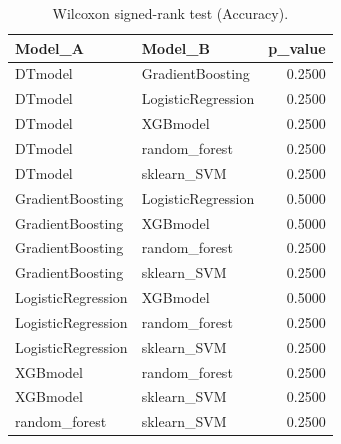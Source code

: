 \begin{table}[t]
\centering
\begin{tabular}{llr}
\toprule
Model_A & Model_B & p_value \\
\midrule
DTmodel & GradientBoosting & 0.2500 \\
DTmodel & LogisticRegression & 0.2500 \\
DTmodel & XGBmodel & 0.2500 \\
DTmodel & random_forest & 0.2500 \\
DTmodel & sklearn_SVM & 0.2500 \\
GradientBoosting & LogisticRegression & 0.5000 \\
GradientBoosting & XGBmodel & 0.5000 \\
GradientBoosting & random_forest & 0.2500 \\
GradientBoosting & sklearn_SVM & 0.2500 \\
LogisticRegression & XGBmodel & 0.5000 \\
LogisticRegression & random_forest & 0.2500 \\
LogisticRegression & sklearn_SVM & 0.2500 \\
XGBmodel & random_forest & 0.2500 \\
XGBmodel & sklearn_SVM & 0.2500 \\
random_forest & sklearn_SVM & 0.2500 \\
\bottomrule
\end{tabular}
\caption{Wilcoxon signed-rank test (Accuracy).}
\label{tab:wilcoxon_Accuracy}
\end{table}